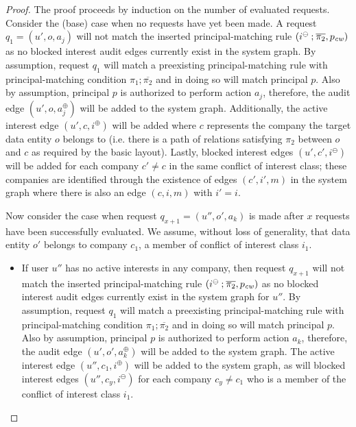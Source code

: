 \documentclass{article}
\newcommand{\comp}{\mathbin{;}}
\newcommand{\audita}[1]{\ensuremath{#1^\oplus}}
\newcommand{\interesta}{\ensuremath{i^\oplus}}
\newcommand{\interestb}{\ensuremath{i^\ominus}}
\begin{document}
\begin{proof}
    The proof proceeds by induction on the number of evaluated requests.
    Consider the (base) case when no requests have yet been made.
    A request $q_1 = (u', o, a_j)$ will not match the inserted principal-matching rule $(\interestb \comp \overline{\pi_2}, p_{\it cw})$ as no blocked interest audit edges currently exist in the system graph.
    By assumption, request $q_1$ will match a preexisting principal-matching rule with principal-matching condition $\pi_1 \comp \overline{\pi_2}$ and in doing so will match principal $p$.
    Also by assumption, principal $p$ is authorized to perform action $a_j$, therefore, the audit edge $(u',o,\audita{a_j})$ will be added to the system graph.
    Additionally, the active interest edge $(u',c,\interesta)$ will be added where $c$ represents the company the target data entity $o$ belongs to (i.e. there is a path of relations satisfying $\pi_2$ between $o$ and $c$ as required by the basic layout).
    Lastly, blocked interest edges $(u',c',\interestb)$ will be added for each company $c' \neq c$ in the same conflict of interest class; these companies are identified through the existence of edges $(c',i',m)$ in the system graph where there is also an edge $(c,i,m)$ with $i' = i$.

    Now consider the case when request $q_{x+1} = (u'',o',a_k)$ is made after $x$ requests have been successfully evaluated.
    We assume, without loss of generality, that data entity $o'$ belongs to company $c_1$, a member of conflict of interest class $i_1$.
    \begin{itemize}
        \item If user $u''$ has no active interests in any company, then request $q_{x+1}$ will not match the inserted principal-matching rule $(\interestb \comp \overline{\pi_2}, p_{\it cw})$ as no blocked interest audit edges currently exist in the system graph for $u''$.
            By assumption, request $q_1$ will match a preexisting principal-matching rule with principal-matching condition $\pi_1 \comp \overline{\pi_2}$ and in doing so will match principal $p$.
            Also by assumption, principal $p$ is authorized to perform action $a_k$, therefore, the audit edge $(u',o',\audita{a_k})$ will be added to the system graph.
            The active interest edge $(u'',c_1,\interesta)$ will be added to the system graph, as will blocked interest edges $(u'',c_y,\interestb)$ for each company $c_y \neq c_1$ who is a member of the conflict of interest class $i_1$.


\end{itemize}
\end{proof}
\end{document}
